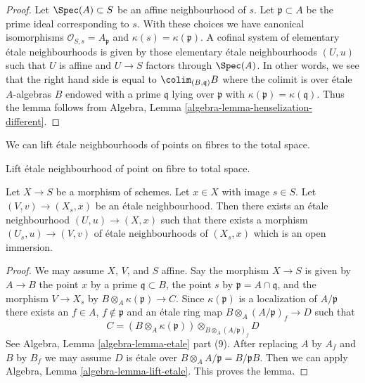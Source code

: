 \begin{proof}
Let $\Spec(A) \subset S$ be an affine neighbourhood of $s$.
Let $\mathfrak p \subset A$ be the prime ideal corresponding to $s$.
With these choices we have canonical isomorphisms
$\mathcal{O}_{S, s} = A_{\mathfrak p}$ and $\kappa(s) = \kappa(\mathfrak p)$.
A cofinal system of elementary \'etale neighbourhoods is given by those
elementary \'etale neighbourhoods $(U, u)$ such that $U$ is affine and
$U \to S$ factors through $\Spec(A)$. In other words, we see that
the right hand side is equal to $\colim_{(B, \mathfrak q)} B$
where the colimit is over \'etale $A$-algebras $B$ endowed with a prime
$\mathfrak q$ lying over $\mathfrak p$ with
$\kappa(\mathfrak p) = \kappa(\mathfrak q)$.
Thus the lemma follows from
Algebra, Lemma \ref{algebra-lemma-henselization-different}.
\end{proof}

\noindent
We can lift \'etale neighbourhoods of points on fibres
to the total space.

\begin{lemma}
\label{lemma-lift-etale-neighbourhood-fibre}
\begin{slogan}
Lift \'etale neighbourhood of point on fibre to total space.
\end{slogan}
Let $X \to S$ be a morphism of schemes. Let $x \in X$ with image $s \in S$.
Let $(V, v) \to (X_s, x)$ be an \'etale neighbourhood.
Then there exists an \'etale neighbourhood $(U, u) \to (X, x)$
such that there exists a morphism $(U_s, u) \to (V, v)$
of \'etale neighbourhoods of $(X_s, x)$ which is an open immersion.
\end{lemma}

\begin{proof}
We may assume $X$, $V$, and $S$ affine. Say the morphism
$X \to S$ is given by $A \to B$ the point $x$ by a prime
$\mathfrak q \subset B$, the point $s$ by $\mathfrak p = A \cap \mathfrak q$,
and the morphism $V \to X_s$ by $B \otimes_A \kappa(\mathfrak p) \to C$.
Since $\kappa(\mathfrak p)$ is a localization of
$A/\mathfrak p$ there exists an $f \in A$, $f \not \in \mathfrak p$
and an \'etale ring map $B \otimes_A (A/\mathfrak p)_f \to D$
such that
$$
C = (B \otimes_A \kappa(\mathfrak p))
\otimes_{B \otimes_A (A/\mathfrak p)_f} D
$$
See Algebra, Lemma \ref{algebra-lemma-etale} part (9).
After replacing $A$ by $A_f$ and $B$ by $B_f$ we may assume
$D$ is \'etale over $B \otimes_A A/\mathfrak p = B/\mathfrak p B$.
Then we can apply Algebra, Lemma \ref{algebra-lemma-lift-etale}.
This proves the lemma.
\end{proof}














